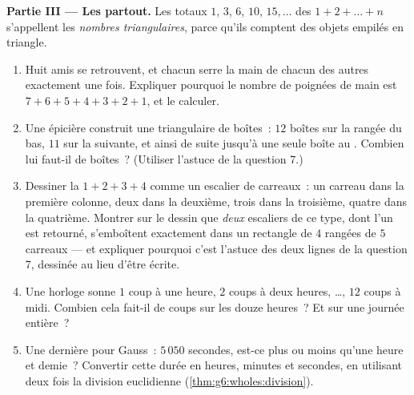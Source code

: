 \begin{problem}
\medskip
\noindent\textbf{Partie III --- Les  partout.}
Les totaux $1$, $3$, $6$, $10$, $15, \dots$ des 
$1 + 2 + \dots + n$ s'appellent les \emph{nombres
triangulaires}, parce qu'ils comptent
des objets empilés en triangle.
\begin{enumerate}[resume]
  \item Huit amis se retrouvent, et chacun serre la main de chacun
        des autres exactement une fois. Expliquer pourquoi le nombre
        de poignées de main est $7 + 6 + 5 + 4 + 3 + 2 + 1$, et le
        calculer.
  \item Une épicière construit une  triangulaire de boîtes~:
        $12$ boîtes sur la rangée du bas, $11$ sur la suivante, et
        ainsi de suite jusqu'à une seule boîte au . Combien lui
        faut-il de boîtes~? (Utiliser l'astuce de la question 7.)
  \item Dessiner la  $1 + 2 + 3 + 4$ comme un escalier de
        carreaux~: un carreau dans la première colonne, deux dans la
        deuxième, trois dans la troisième, quatre dans la quatrième.
        Montrer sur le dessin que \emph{deux} escaliers de ce type,
        dont l'un est retourné, s'emboîtent exactement dans un
        rectangle de $4$ rangées de $5$ carreaux --- et expliquer
        pourquoi c'est l'astuce des deux lignes de la question 7,
        dessinée au lieu d'être écrite.
  \item Une horloge sonne $1$ coup à une heure, $2$ coups à deux
        heures, \dots, $12$ coups à midi. Combien cela fait-il de
        coups sur les douze heures~? Et sur une journée entière~?
  \item Une dernière pour Gauss~: $5\,050$ secondes, est-ce plus ou
        moins qu'une heure et demie~? Convertir cette durée en
        heures, minutes et secondes, en utilisant deux fois la
        division euclidienne (\cref{thm:g6:wholes:division}).
\end{enumerate}
\end{problem}
